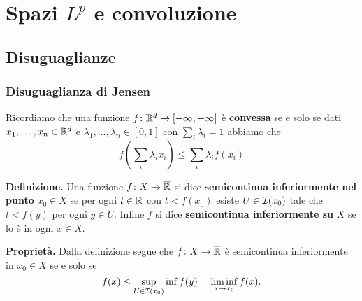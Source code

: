 %
%

\chapter{Spazi $L^p$ e convoluzione}

\section{Disuguaglianze}

\subsection{Disuguaglianza di Jensen}

Ricordiamo che una funzione $f \colon \mathbb R^d \to [-\infty, +\infty]$ è \textbf{convessa} se e solo se dati $x_1, \dots, x_n \in \mathbb R^d$ e $\lambda_1, \dots, \lambda_n \in [0, 1]$ con $\sum_i \lambda_i = 1$ abbiamo che
$$
	f \left(\sum_i \lambda_i x_i \right) \leq \sum_i \lambda_i f(x_i)
$$

\textbf{Definizione.} Una funzione $f \colon X \to \overline{\mathbb R}$ si dice \textbf{semicontinua inferiormente nel punto} $x_0 \in X$ se per ogni $t \in \mathbb R$ con $t < f(x_0)$ esiste $U \in \mathcal{I}(x_0)$ tale che $t < f(y)$ per ogni $y \in U$. Infine $f$ si dice \textbf{semicontinua inferiormente su} $X$ se lo è in ogni $x \in X$.

\textbf{Proprietà.} Dalla definizione segue che $f \colon X \to \overline{\mathbb R}$ è semicontinua inferiormente in $x_0 \in X$ se e solo se
$$
	f(x) \leq \sup_{U \in \mathcal{I}(x_0)} \inf f(y) = \liminf_{x \to x_0} f(x).
$$


